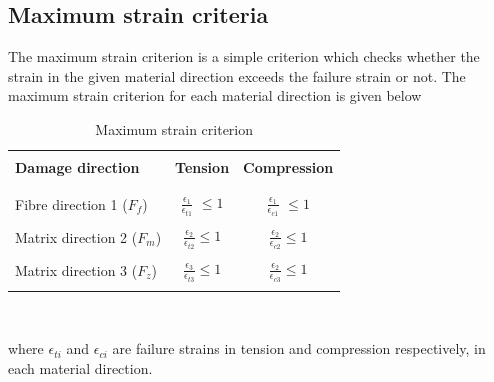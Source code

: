 \documentclass[a4paper,12pt,twoside]{report}
\begin{document}
\subsection{Maximum strain criteria}\label{Maximum strain criteria}
\indent\indent\indent The maximum strain criterion is a simple criterion which checks whether the strain in the given material direction exceeds the failure strain or not. The maximum strain criterion for each material direction is given below\\
\begin{table}[htbp]
  \begin{center}
     \begin{tabular}{l  c  c} 
     \hline
     \\
      \textbf{Damage direction} \;\;& \textbf{Tension} \;& \textbf{Compression}\\
      \\
      \hline
      \\
      Fibre direction 1 ($F_{f}$) & \Large{$\frac{\epsilon_{1}}{\epsilon_{t1}} $}\small{ $\leq 1$} &  \Large{$\frac{\epsilon_{1}}{\epsilon_{c1}} $}\small{ $\leq 1$}\\
      \\
      Matrix direction 2 ($F_{m}$)  &  \Large{$\frac{\epsilon_{2}}{\epsilon_{t2}} $}\small{$\leq 1$}  & \Large{$\frac{\epsilon_{2}}{\epsilon_{c2}} $}\small{$\leq 1$}\\
      \\
      Matrix direction 3 ($F_{z}$) &  \Large{$\frac{\epsilon_{3}}{\epsilon_{t3}} $}\small{$\leq 1$}  &   \Large{$\frac{\epsilon_{2}}{\epsilon_{c3}} $}\small{$\leq 1$}\\
       \\
       \hline
    \end{tabular}
    \\
    \caption{Maximum strain criterion}
    \label{tab:Maximum strain criterion}
  \end{center}
\end{table}
\FloatBarrier
where $\epsilon_{ti}$ and $\epsilon_{ci}$ are failure strains in tension and compression respectively, in each material direction. 
\\
\end{document}

